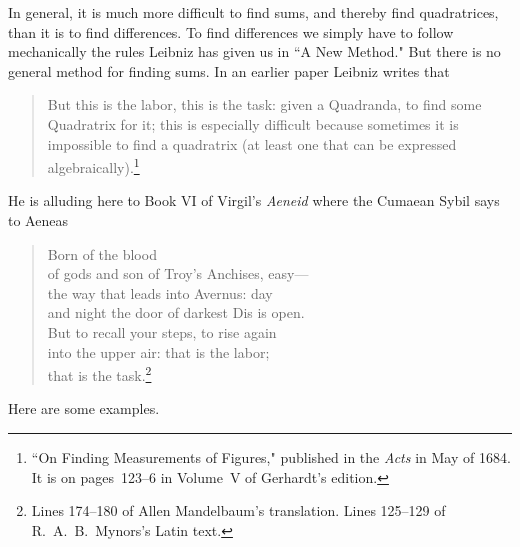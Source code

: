 \documentclass[polutonikogreek,english,twoside,openright]{article}
\begin{document}
In general, it is much more difficult to find sums, and thereby find quadratrices, than it is to find differences.  To find differences we simply have to follow mechanically the rules Leibniz has given us in ``A New Method."  But there is no general method for finding sums.  In an earlier paper Leibniz writes that 
\begin{quote}
But this is the labor, this is the
task: given a Quadranda, to find some Quadratrix for it; this is especially difficult because sometimes it is
impossible to find a quadratrix (at least one that can be expressed
algebraically).\footnote{``On Finding Measurements of Figures," published in the {\em Acts} in May of 1684.  It is on pages~123--6 in Volume~V of Gerhardt's edition.}
\end{quote}
He is alluding here to Book VI of Virgil's {\em Aeneid} where the Cumaean Sybil says to Aeneas
\begin{verse}
Born of the blood \\
of gods and son of Troy's Anchises, easy---\\
the way that leads into Avernus: day \\
and night the door of darkest Dis is open.\\
But to recall your steps, to rise again \\
into the upper air: that is the labor;\\
that is the task.\footnote{Lines 174--180 of Allen Mandelbaum's translation.  Lines 125--129 of R.\ A.\ B.\ Mynors's Latin text.}
\end{verse}

Here are some examples.
\end{document}

